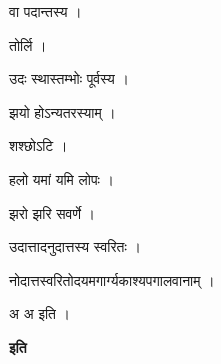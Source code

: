 \documentclass[10pt, openany]{book}
\begin{document}
\noindent वा पदान्तस्य ।

\noindent तोर्लि ।

\noindent उदः स्थास्तम्भोः पूर्वस्य ।

\noindent झयो होऽन्यतरस्याम् ।

\noindent शश्छोऽटि ।

\noindent हलो यमां यमि लोपः ।

\noindent झरो झरि सवर्णे ।

\noindent उदात्तादनुदात्तस्य स्वरितः ।

\noindent नोदात्तस्वरितोदयमगार्ग्यकाश्यपगालवानाम् ।

\noindent अ अ इति ।

\begin{center}\textbf{इति}\end{center}
\end{document}
